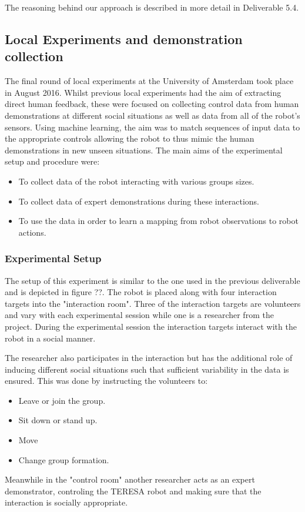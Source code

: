 \documentclass[a4paper,11pt]{report}
\begin{document}
The reasoning behind our approach is described in more detail in Deliverable 5.4. 

\subsection{Local Experiments and demonstration collection}
\label{sec:initial_experiment}
The final round of local experiments at the University of Amsterdam took place in August 2016. Whilst previous local experiments had the aim of extracting direct human feedback, these were focused on collecting control data from human demonstrations at different social situations as well as data from all of the robot's sensors. Using machine learning, the aim was to match sequences of input data to the appropriate controls allowing the robot to thus mimic the human demonstrations in new unseen situations. The main aims of the experimental setup and procedure were:

\begin{itemize}
\item To collect data of the robot interacting with various groups sizes.
\item To collect data of expert demonstrations during these interactions. 
\item To use the data in order to learn a mapping from robot observations to robot actions.
\end{itemize}

\subsubsection{Experimental Setup}
The setup of this experiment is similar to the one used in the previous deliverable and is depicted in figure ??. The robot is placed along with four interaction targets into the "interaction room". Three of the interaction targets are volunteers and vary with each experimental session while one is a researcher from the project. During the experimental session the interaction targets interact with the robot in a social manner. 

The researcher also participates in the interaction but has the additional role of inducing different social situations such that sufficient variability in the data is ensured. This was done by instructing the volunteers to:

\begin{itemize}
 	\item Leave or join the group.
 	\item Sit down or stand up.
 	\item Move
 	\item Change group formation.
\end{itemize}
 Meanwhile in the "control room" another researcher acts as an expert demonstrator, controling the TERESA robot and making sure that the interaction is socially appropriate. 
\end{document}
